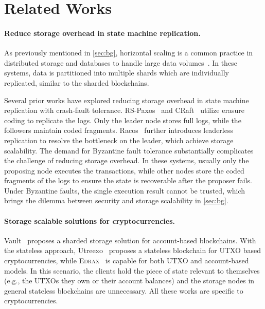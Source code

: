 \section{Related Works}
\label{sec:rel}

\paragraph{Reduce storage overhead in state machine replication.}
As previously mentioned in \cref{sec:bg}, horizontal scaling is a common practice in distributed storage and databases to handle large data volumes~\cite{gfs,bigtable,spanner}.
In these systems, data is partitioned into multiple shards which are individually replicated, similar to the sharded blockchains.

Several prior works have explored reducing storage overhead in state machine replication with crash-fault tolerance.
RS-Paxos~\cite{mu2014paxos} and CRaft~\cite{wang2020craft} utilize erasure coding to replicate the logs.
Only the leader node stores full logs, while the followers maintain coded fragments.
Racos~\cite{zarnstorff2024racos} further introduces leaderless replication to resolve the bottleneck on the leader, which achieve storage scalability.
The demand for Byzantine fault tolerance substantially complicates the challenge of reducing storage overhead.
In these systems, usually only the proposing node executes the transactions, while other nodes store the coded fragments of the logs to ensure the state is recoverable after the proposer fails.
Under Byzantine faults, the single execution result cannot be trusted, which brings the dilemma between security and storage scalability in \cref{sec:bg}.

\paragraph{Storage scalable solutions for cryptocurrencies.}
Vault~\cite{leung2018vault} proposes a sharded storage solution for account-based blockchains.
With the stateless approach, Utreexo~\cite{dryja2019utreexo} proposes a stateless blockchain for UTXO based cryptocurrencies, while \textsc{Edrax}~\cite{chepurnoy2018edrax} is capable for both UTXO and account-based models.
In this scenario, the clients hold the piece of state relevant to themselves (e.g., the UTXOs they own or their account balances) and the storage nodes in general stateless blockchains are unnecessary.
All these works are specific to cryptocurrencies.

